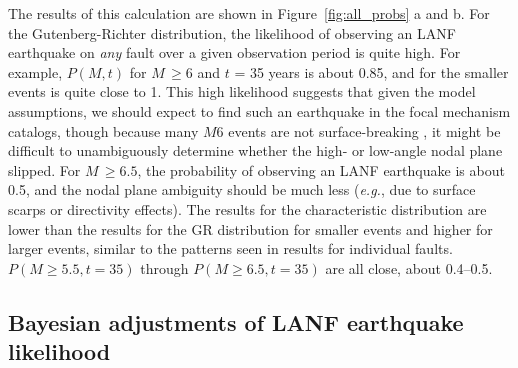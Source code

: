 \documentclass[draft,grl]{AGUTeX}
\begin{document}
\begin{article}
The results of this calculation are shown in Figure~\ref{fig:all_probs} a and b.
For the Gutenberg-Richter distribution, the likelihood of observing an LANF
earthquake on \emph{any} fault over a given observation period is quite high.
For example, $P(M,t)$ for $M \, \ge 6$ and $t$ = 35 years is about 0.85, and
for the smaller events is quite close to 1.  This high likelihood suggests that
given the model assumptions, we should expect to find such an earthquake in the
focal mechanism catalogs, though because many $M6$ events are not
surface-breaking \citep{hecker2013eqdist}, it might be difficult to
unambiguously determine whether the high- or low-angle nodal plane slipped.
For $M \, \ge 6.5$, the probability of observing an LANF earthquake is about
0.5, and the nodal plane ambiguity should be much less ({\it e.g.}, due to
surface scarps or directivity effects).  The results for the characteristic
distribution are lower than the results for the GR distribution for smaller
events and higher for larger events, similar to the patterns seen in results
for individual faults. $P(M\ge5.5,t=35)$ through $P(M\ge6.5,t=35)$ are all
close, about 0.4--0.5.

\subsection{Bayesian adjustments of LANF earthquake likelihood}


\end{article}
\end{document}
